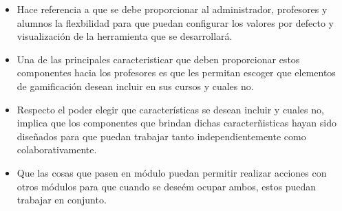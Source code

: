     \begin{multicols}{2}
    \begin{itemize}

    \item[] Hace referencia a que se debe proporcionar al administrador, profesores
            y alumnos la flexbilidad para que puedan configurar los valores por defecto
            y visualización de la herramienta que se desarrollará.


    \item[] Una de las principales caracteristicar que deben proporcionar estos
            componentes hacia los profesores es que les permitan escoger que elementos
            de gamificación desean incluir en sus cursos y cuales no.\\



    \item[] Respecto el poder elegir que características se desean incluir y cuales no,
            implica que los componentes que brindan dichas caracterñisticas hayan sido
            diseñados para que puedan trabajar tanto independientemente como
            colaborativamente.


    \item[] Que las cosas que pasen en módulo puedan permitir realizar acciones con
            otros módulos para que cuando se deseém ocupar ambos, estos puedan trabajar
            en conjunto.

    \end{itemize}
    \end{multicols}
